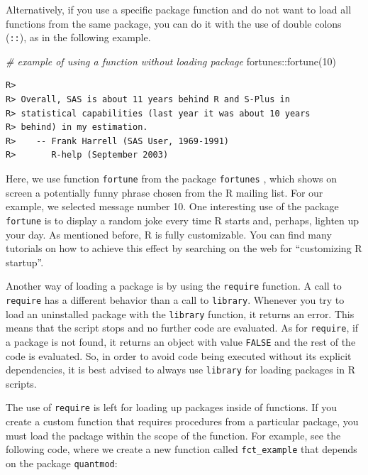 \documentclass[
  12pt,
]{book}
\newenvironment{Shaded}{\begin{snugshade}}{\end{snugshade}}
\newcommand{\CommentTok}[1]{\textcolor[rgb]{0.37,0.37,0.37}{\textit{#1}}}
\newcommand{\DecValTok}[1]{\textcolor[rgb]{0.06,0.06,0.06}{#1}}
\newcommand{\FunctionTok}[1]{\textcolor[rgb]{0,0,0}{#1}}
\newcommand{\NormalTok}[1]{#1}
\newcommand{\SpecialCharTok}[1]{\textcolor[rgb]{0,0,0}{#1}}
\begin{document}
Alternatively, if you use a specific package function and do not want to load all functions from the same package, you can do it with the use of double colons (\texttt{::}), as in the following example. 

\begin{Shaded}
\begin{Highlighting}[]
\CommentTok{\# example of using a function without loading package}
\NormalTok{fortunes}\SpecialCharTok{::}\FunctionTok{fortune}\NormalTok{(}\DecValTok{10}\NormalTok{)}
\end{Highlighting}
\end{Shaded}

\begin{verbatim}
R> 
R> Overall, SAS is about 11 years behind R and S-Plus in
R> statistical capabilities (last year it was about 10 years
R> behind) in my estimation.
R>    -- Frank Harrell (SAS User, 1969-1991)
R>       R-help (September 2003)
\end{verbatim}

Here, we use function \texttt{fortune} from the package \texttt{fortunes} \citep{R-fortunes}, which shows on screen a potentially funny phrase chosen from the R mailing list. For our example, we selected message number 10. One interesting use of the package \texttt{fortune} is to display a random joke every time R starts and, perhaps, lighten up your day. As mentioned before, R is fully customizable. You can find many tutorials on how to achieve this effect by searching on the web for ``customizing R startup''.

Another way of loading a package is by using the \texttt{require} function. A call to \texttt{require} has a different behavior than a call to \texttt{library}. Whenever you try to load an uninstalled package with the \texttt{library} function, it returns an error. This means that the script stops and no further code are evaluated. As for \texttt{require}, if a package is not found, it returns an object with value \texttt{FALSE} and the rest of the code is evaluated. So, in order to avoid code being executed without its explicit dependencies, it is best advised to always use \texttt{library} for loading packages in R scripts. 

The use of \texttt{require} is left for loading up packages inside of functions. If you create a custom function that requires procedures from a particular package, you must load the package within the scope of the function. For example, see the following code, where we create a new function called \texttt{fct\_example} that depends on the package \texttt{quantmod}:
\end{document}
